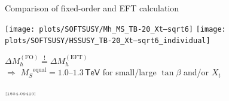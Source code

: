\documentclass[hyperref={pdfpagelabels=false},ngerman]{beamer}
\newcommand{\eh}[1]{\,\mathsf{#1}}
\newcommand{\MS}{\ensuremath{M_S}}
\newcommand{\mycite}[1]{\ensuremath{\text{\textcolor{darkgray}{\tiny [#1]}}}}
\newcommand{\SM}{\ensuremath{\text{SM}}}
\newcommand{\MSSM}{\ensuremath{\text{MSSM}}}
\newcommand{\TeV}{\eh{TeV}}
\newcommand{\DMh}{\ensuremath{\Delta M_h^{(\text{FO})}}}
\newcommand{\DMhHSSUSY}{\ensuremath{\Delta M_h^{(\text{EFT})}}}
\begin{document}

\begin{frame}{Comparison of fixed-order and EFT calculation}
  \begin{center}
    \texttt{[image: plots/SOFTSUSY/Mh\_MS\_TB-20\_Xt--sqrt6]}\hfill
    \texttt{[image: plots/SOFTSUSY/HSSUSY\_TB-20\_Xt--sqrt6\_individual]}
  \end{center}
  \begin{center}
    $\DMh \overset{!}{=} \DMhHSSUSY$\\[0.5em]
    $\Rightarrow$ $\MS^{\text{equal}} = 1.0$--$1.3\TeV$ for
    small/large $\tan\beta$ and/or $X_t$
  \end{center}
  \mycite{1804.09410}
\end{frame}
\end{document}
